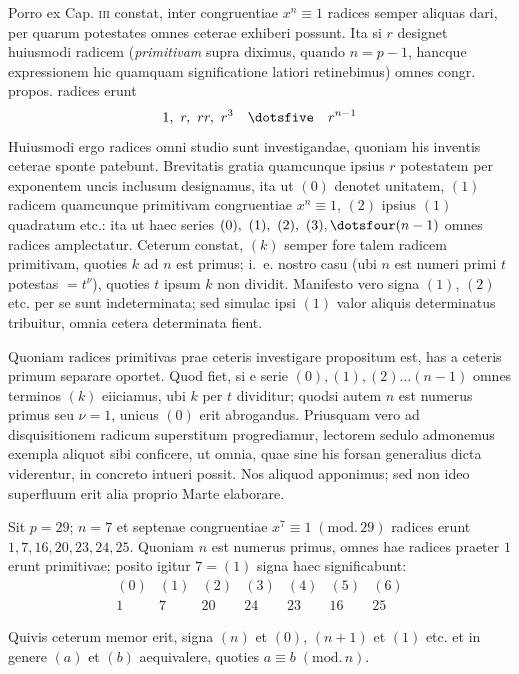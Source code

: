 Porro ex Cap. \textsc{iii} constat, inter congruentiae $x^n\equiv1$ radices semper aliquas dari, per quarum potestates omnes ceterae exhiberi possunt. Ita si $r$ designet huiusmodi radicem (\emph{primitivam} supra diximus, quando $n=p-1$, hancque expressionem hic quamquam significatione latiori retinebimus) omnes congr. propos. radices erunt
\[
1,\ r,\ rr,\ r^3\quad\dotsfive\quad r^{n-1}
\]
Huiusmodi ergo radices omni studio sunt investigandae, quoniam his inventis ceterae sponte patebunt. Brevitatis gratia quamcunque ipsius $r$ potestatem per exponentem uncis inclusum designamus, ita ut $(0)$ denotet unitatem, $(1)$ radicem quamcunque primitivam congruentiae $x^n\equiv1$, $(2)$ ipsius $(1)$ quadratum etc.: ita ut haec series $(0),\ (1),\ (2),\ (3),\dotsfour(n-1)$ omnes radices amplectatur. Ceterum constat, $(k)$ semper fore talem radicem primitivam, quoties $k$ ad $n$ est primus; i.~e. nostro casu (ubi $n$ est numeri primi $t$ potestas $=t^\nu$), quoties $t$ ipsum $k$ non dividit. Manifesto vero signa $(1)$, $(2)$ etc. per se sunt indeterminata; sed simulac ipsi $(1)$ valor aliquis determinatus tribuitur, omnia cetera determinata fient.

Quoniam radices primitivas prae ceteris investigare propositum est, has a ceteris primum separare oportet. Quod fiet, si e serie $(0),(1),(2)\ldots(n-1)$ omnes terminos $(k)$ eiiciamus, ubi $k$ per $t$ dividitur; quodsi autem $n$ est numerus primus seu $\nu=1$, unicus $(0)$ erit abrogandus. Priusquam vero ad disquisitionem radicum superstitum progrediamur, lectorem sedulo admonemus exempla aliquot sibi conficere, ut omnia, quae sine his forsan generalius dicta viderentur, in concreto intueri possit. Nos aliquod apponimus; sed non ideo superfluum erit alia proprio Marte elaborare.

Sit $p=29$; $n=7$ et septenae congruentiae $x^7\equiv1\;(\mathrm{mod.}\,29)$ radices erunt $1,7,16,20,23,24,25$. Quoniam $n$ est numerus primus, omnes hae radices praeter $1$ erunt primitivae; posito igitur $7=(1)$ signa haec significabunt:
\[
\begin{array}{ccccccc}
(0)&(1)&(2)&(3)&(4)&(5)&(6)\\
1&7&20&24&23&16&25
\end{array}
\]

Quivis ceterum memor erit, signa $(n)$ et $(0)$, $(n+1)$ et $(1)$ etc. et in genere $(a)$ et $(b)$ aequivalere, quoties $a\equiv b\;(\mathrm{mod.}\,n)$.

